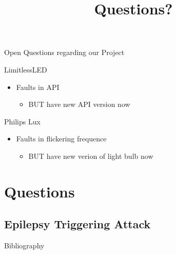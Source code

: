 \documentclass[11pt,t,usepdftitle=false,aspectratio=169]{beamer}
\begin{document}
\begin{frame}{Open Questions regarding our Project} %
    \begin{block}{LimitlessLED}
        \begin{itemize}
            \item Faults in API %
            \begin{itemize}
                \item BUT have new API version now
            \end{itemize}
        \end{itemize}
    \end{block}
    
    \begin{block}{Philips Lux}
        \begin{itemize}
            \item Faults in flickering frequence  %
            \begin{itemize}
                \item BUT have new verion of light bulb now
            \end{itemize}
        \end{itemize}
    \end{block}
\end{frame}



\title{Questions?}
\subtitle{}
\section{Questions}


\appendix
\subsection{Epilepsy Triggering Attack}%
\label{sub:epilepsy_triggering_attack}

\begin{frame}[allowframebreaks]{Bibliography}
	
	
\end{frame}
\end{document}
